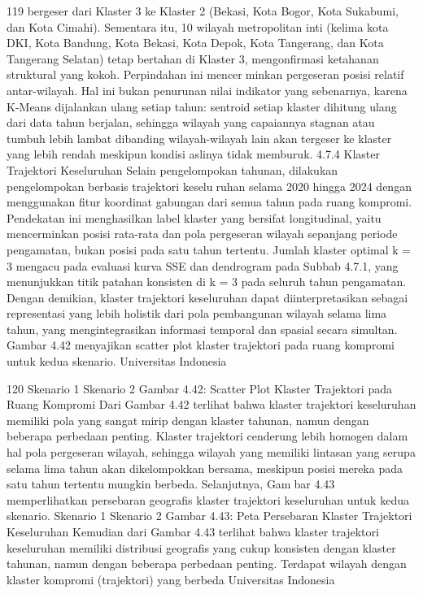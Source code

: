 119
bergeser dari Klaster 3 ke Klaster 2 (Bekasi, Kota Bogor, Kota Sukabumi, dan Kota
Cimahi). Sementara itu, 10 wilayah metropolitan inti (kelima kota DKI, Kota Bandung,
Kota Bekasi, Kota Depok, Kota Tangerang, dan Kota Tangerang Selatan) tetap bertahan
di Klaster 3, mengonfirmasi ketahanan struktural yang kokoh. Perpindahan ini mencerminkan pergeseran posisi relatif antar-wilayah. Hal ini bukan penurunan nilai indikator
yang sebenarnya, karena K-Means dijalankan ulang setiap tahun: sentroid setiap klaster
dihitung ulang dari data tahun berjalan, sehingga wilayah yang capaiannya stagnan atau
tumbuh lebih lambat dibanding wilayah-wilayah lain akan tergeser ke klaster yang lebih
rendah meskipun kondisi aslinya tidak memburuk.
4.7.4 Klaster Trajektori Keseluruhan
Selain pengelompokan tahunan, dilakukan pengelompokan berbasis trajektori keseluruhan selama 2020 hingga 2024 dengan menggunakan fitur koordinat gabungan dari semua
tahun pada ruang kompromi. Pendekatan ini menghasilkan label klaster yang bersifat
longitudinal, yaitu mencerminkan posisi rata-rata dan pola pergeseran wilayah sepanjang
periode pengamatan, bukan posisi pada satu tahun tertentu. Jumlah klaster optimal k = 3
mengacu pada evaluasi kurva SSE dan dendrogram pada Subbab 4.7.1, yang menunjukkan
titik patahan konsisten di k = 3 pada seluruh tahun pengamatan. Dengan demikian, klaster
trajektori keseluruhan dapat diinterpretasikan sebagai representasi yang lebih holistik dari
pola pembangunan wilayah selama lima tahun, yang mengintegrasikan informasi temporal
dan spasial secara simultan. Gambar 4.42 menyajikan scatter plot klaster trajektori pada
ruang kompromi untuk kedua skenario.
Universitas Indonesia

120
Skenario 1 Skenario 2
Gambar 4.42: Scatter Plot Klaster Trajektori pada Ruang Kompromi
Dari Gambar 4.42 terlihat bahwa klaster trajektori keseluruhan memiliki pola yang
sangat mirip dengan klaster tahunan, namun dengan beberapa perbedaan penting. Klaster
trajektori cenderung lebih homogen dalam hal pola pergeseran wilayah, sehingga wilayah
yang memiliki lintasan yang serupa selama lima tahun akan dikelompokkan bersama,
meskipun posisi mereka pada satu tahun tertentu mungkin berbeda. Selanjutnya, Gambar 4.43 memperlihatkan persebaran geografis klaster trajektori keseluruhan untuk kedua
skenario.
Skenario 1 Skenario 2
Gambar 4.43: Peta Persebaran Klaster Trajektori Keseluruhan
Kemudian dari Gambar 4.43 terlihat bahwa klaster trajektori keseluruhan memiliki
distribusi geografis yang cukup konsisten dengan klaster tahunan, namun dengan beberapa
perbedaan penting. Terdapat wilayah dengan klaster kompromi (trajektori) yang berbeda
Universitas Indonesia

